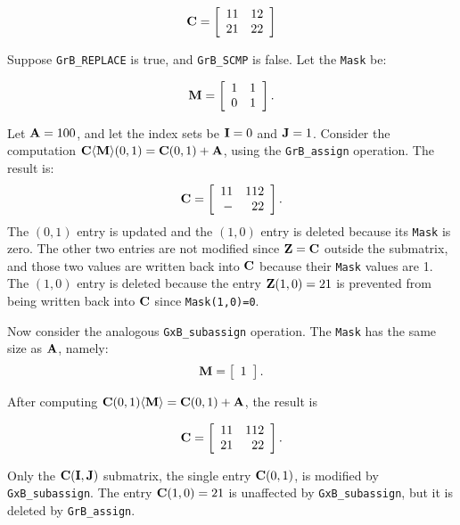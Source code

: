 \documentclass[12pt]{article}
\begin{document}
\[
{\bf C} = \left[
    \begin{array}{rr}
    11 & 12 \\
    21 & 22 \\
    \end{array}
    \right]
\]

Suppose \verb'GrB_REPLACE' is true, and \verb'GrB_SCMP' is false.  Let the
\verb'Mask' be:

\[
{\bf M} = \left[
    \begin{array}{rr}
    1 & 1 \\
    0 & 1 \\
    \end{array}
    \right].
\]

Let ${\bf A} = 100$, and let the index sets be ${\bf I}=0$ and ${\bf J}=1$.
Consider the computation
${\bf C \langle M \rangle} (0,1) = {\bf C}(0,1) + {\bf A}$,
using the \verb'GrB_assign' operation.  The result is:
\[
{\bf C} = \left[
    \begin{array}{rr}
    11 & 112 \\
     - &  22 \\
    \end{array}
    \right].
\]
The $(0,1)$ entry is updated and the $(1,0)$ entry is deleted because
its \verb'Mask' is zero.  The other two entries are not modified since ${\bf Z}
= {\bf C}$ outside the submatrix, and those two values are written back into
${\bf C}$ because their \verb'Mask' values are 1.  The $(1,0)$ entry is deleted
because the entry ${\bf Z}(1,0)=21$ is prevented from being written back into
${\bf C}$ since \verb'Mask(1,0)=0'.

Now consider the analogous \verb'GxB_subassign' operation.  The \verb'Mask' has
the same size as ${\bf A}$, namely:
\[
{\bf M} = \left[
    \begin{array}{r}
    1 \\
    \end{array}
    \right].
\]

After computing
${\bf C} (0,1) {\bf \langle M \rangle} = {\bf C}(0,1) + {\bf A}$,
the result is

\[
{\bf C} = \left[
    \begin{array}{rr}
    11 & 112 \\
    21 &  22 \\
    \end{array}
    \right].
\]

Only the ${\bf C(I,J)}$ submatrix, the single entry ${\bf C}(0,1)$, is modified
by \verb'GxB_subassign'.  The entry ${\bf C}(1,0)=21$ is unaffected by
\verb'GxB_subassign', but it is deleted by \verb'GrB_assign'.
\end{document}
